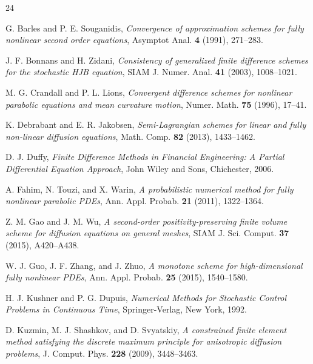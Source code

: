 \documentclass[11pt]{article}
\theoremstyle{mythm}
\theoremstyle{definition}
\begin{document}
	
	\begin{thebibliography}{24} %
		
		G. Barles and P. E. Souganidis,
		\textit{Convergence of approximation schemes for fully nonlinear second order equations},
		Asymptot Anal. \textbf{4} (1991), 271--283.
		
		J. F. Bonnans and H. Zidani,
		\textit{Consistency of generalized finite difference schemes for the stochastic HJB equation},
		SIAM J. Numer. Anal. \textbf{41} (2003), 1008--1021.
		
		M. G. Crandall and P. L. Lions,
		\textit{Convergent difference schemes for nonlinear parabolic equations and mean curvature motion},
		Numer. Math. \textbf{75} (1996), 17--41.
		
		K. Debrabant and E. R. Jakobsen,
		\textit{Semi-Lagrangian schemes for linear and fully non-linear diffusion equations},
		Math. Comp. \textbf{82} (2013), 1433--1462.
		
		D. J. Duffy,
		\textit{Finite Difference Methods in Financial Engineering: A Partial Differential Equation Approach},
		John Wiley and Sons, Chichester, 2006.
		
		A. Fahim, N. Touzi, and X. Warin,
		\textit{A probabilistic numerical method for fully nonlinear parabolic PDEs},
		Ann. Appl. Probab. \textbf{21} (2011), 1322--1364.
		
		Z. M. Gao and J. M. Wu,
		\textit{A second-order positivity-preserving finite volume scheme for diffusion equations on general meshes},
		SIAM J. Sci. Comput. \textbf{37} (2015), A420--A438.
		
		W. J. Guo, J. F. Zhang, and J. Zhuo,
		\textit{A monotone scheme for high-dimensional fully nonlinear PDEs},
		Ann. Appl. Probab. \textbf{25} (2015), 1540--1580.
		
		H. J. Kushner and P. G. Dupuis,
		\textit{Numerical Methods for Stochastic Control Problems in Continuous Time},
		Springer-Verlag, New York, 1992.
		
		D. Kuzmin, M. J. Shashkov, and D. Svyatskiy,
		\textit{A constrained finite element method satisfying the discrete maximum principle for anisotropic diffusion problems},
		J. Comput. Phys. \textbf{228} (2009), 3448--3463.
		

\end{thebibliography}
\end{document}
